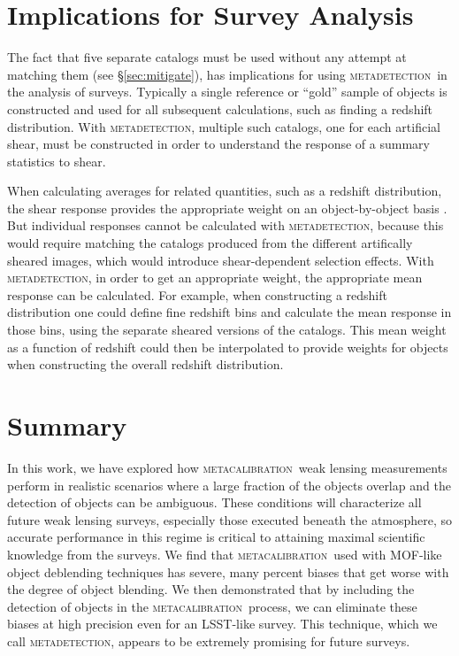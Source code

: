 \documentclass[fleqn,useAMS,usenatbib]{mnras}
\newcommand{\mcal}{\textsc{metacalibration}}
\newcommand{\mdet}{\textsc{metadetection}}
\begin{document}
\section{Implications for Survey Analysis} \label{sec:wavg}

The fact that five separate catalogs must be used without any attempt at
matching them (see \S \ref{sec:mitigate}), has implications for using \mdet\ in
the analysis of surveys.  Typically a single reference or ``gold'' sample of
objects is constructed and used for all subsequent calculations, such as
finding a redshift distribution.  With \mdet, multiple such catalogs, one for
each artificial shear, must be constructed in order to understand the response
of a summary statistics to shear.

When calculating averages for related quantities, such as a redshift
distribution, the shear response provides the appropriate weight on an
object-by-object basis \citep{SheldonMcal2017}.  But individual responses
cannot be calculated with \mdet, because this would require matching the
catalogs produced from the different artifically sheared images, which would
introduce shear-dependent selection effects.  With \mdet, in order to get an
appropriate weight, the appropriate mean response can be calculated.  For
example, when constructing a redshift distribution one could define fine
redshift bins and calculate the mean response in those bins, using the separate
sheared versions of the catalogs. This mean weight as a function of redshift
could then be interpolated to provide weights for objects when constructing the
overall redshift distribution.


\section{Summary}\label{sec:conc}

In this work, we have explored how \mcal\ weak lensing measurements perform in
realistic scenarios where a large fraction of the objects overlap and the
detection of objects can be ambiguous. These conditions will characterize all
future weak lensing surveys, especially those executed beneath the atmosphere,
so accurate performance in this regime is critical to attaining maximal
scientific knowledge from the surveys. We find that \mcal\ used with MOF-like
object deblending techniques has severe, many percent biases that get worse
with the degree of object blending. We then demonstrated that by including the
detection of objects in the \mcal\ process, we can eliminate these biases at
high precision even for an LSST-like survey. This technique, which we call
\mdet, appears to be extremely promising for future surveys.
\end{document}
